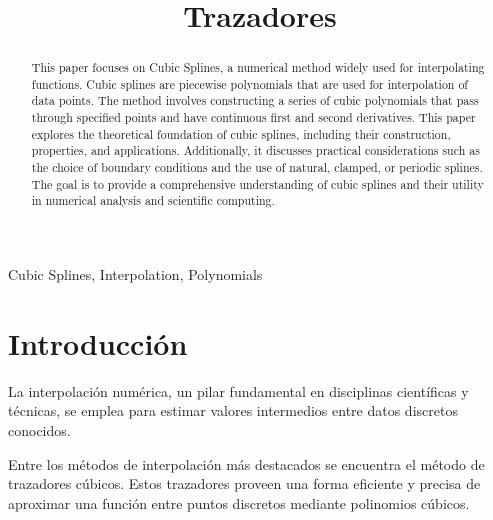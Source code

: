 \documentclass[conference]{IEEEtran}
\begin{document}
\title{Trazadores\\}

\author{
	}

\maketitle




\begin{abstract} This paper focuses on Cubic Splines, a numerical method
	widely used for interpolating functions. Cubic splines are piecewise
	polynomials that are used for interpolation of data points. The method
	involves constructing a series of cubic polynomials that pass through
	specified points and have continuous first and second derivatives. This
	paper explores the theoretical foundation of cubic splines, including
	their construction, properties, and applications. Additionally, it
	discusses practical considerations such as the choice of boundary
	conditions and the use of natural, clamped, or periodic splines. The goal
	is to provide a comprehensive understanding of cubic splines and their
	utility in numerical analysis and scientific computing.
\end{abstract}

\begin{IEEEkeywords}
	Cubic Splines, Interpolation, Polynomials
\end{IEEEkeywords}

\nocite{Trazadores_cúbicos_2014}
\nocite{Chapra_Canale}

\section{Introducción}

La interpolación numérica, un pilar fundamental en disciplinas científicas y
técnicas, se emplea para estimar valores intermedios entre datos discretos
conocidos.

Entre los métodos de interpolación más destacados se encuentra
el método de trazadores cúbicos. Estos trazadores proveen una forma eficiente
y precisa de aproximar una función entre puntos discretos mediante polinomios
cúbicos.
\end{document}
